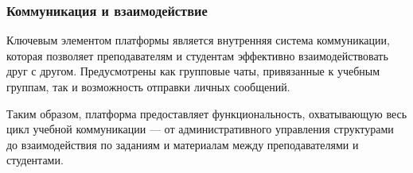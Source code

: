 \subsubsection*{Коммуникация и взаимодействие}
Ключевым элементом платформы является внутренняя система коммуникации, которая позволяет преподавателям и студентам эффективно взаимодействовать друг с другом. Предусмотрены как групповые чаты, привязанные к учебным группам, так и возможность отправки личных сообщений.

Таким образом, платформа предоставляет функциональность, охватывающую весь цикл учебной коммуникации — от административного управления структурами до взаимодействия по заданиям и материалам между преподавателями и студентами.